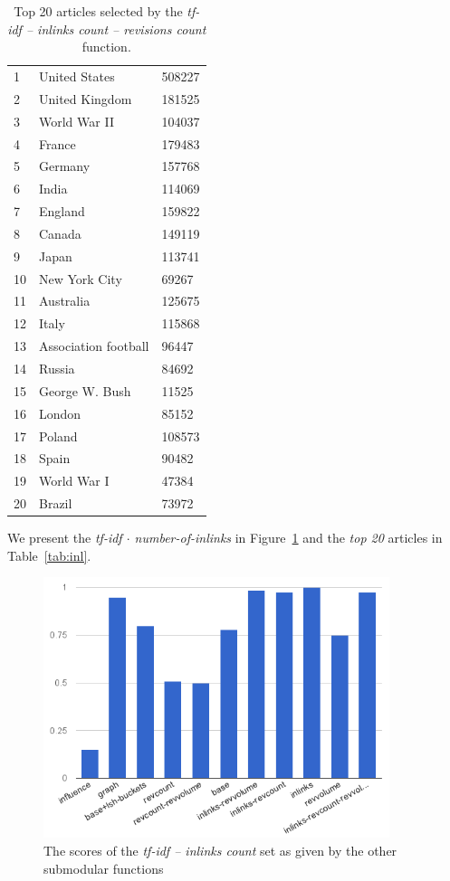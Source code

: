 \begin{table}
    \begin{tabular}{lll}
    1  & United States        & 508227 \\
    2  & United Kingdom       & 181525 \\
    3  & World War II         & 104037 \\
    4  & France               & 179483 \\
    5  & Germany              & 157768 \\
    6  & India                & 114069 \\
    7  & England              & 159822 \\
    8  & Canada               & 149119 \\
    9  & Japan                & 113741 \\
    10 & New York City        & 69267  \\
    11 & Australia            & 125675 \\
    12 & Italy                & 115868 \\
    13 & Association football & 96447  \\
    14 & Russia               & 84692  \\
    15 & George W. Bush       & 11525  \\
    16 & London               & 85152  \\
    17 & Poland               & 108573 \\
    18 & Spain                & 90482  \\
    19 & World War I          & 47384  \\
    20 & Brazil               & 73972  \\
    \end{tabular}
    \caption {Top 20 articles selected by the \emph{tf-idf -- inlinks count --
revisions count} function.}
  \label{tab:inl-rc}
\end{table}

We present the \emph{tf-idf \(\cdot\) number-of-inlinks} in
Figure~\ref{img:inl} and the \emph{top 20} articles in Table~\ref{tab:inl}.
\begin{figure}
  \centering
  \includegraphics[width=0.9\textwidth,natwidth=555,natheight=419]{images/inl.png}
  \caption{The scores of the \emph{tf-idf -- inlinks count} set as given by the
  other submodular functions}
  \label{img:inl}
\end{figure}

